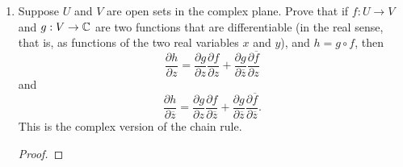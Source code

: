 \documentclass[11pt,a4paper]{book}
\begin{document}
\begin{enumerate}
    \item Suppose \( U  \) and \( V  \) are open sets in the complex plane. Prove that if \( f: U \to V  \) and \( g: V \to \mathbb{C}  \) are two functions that are differentiable (in the real sense, that is, as functions of the two real variables \( x  \) and \( y  \)), and \( h = g \circ f  \), then
       \[  \frac{ \partial h  }{  \partial z  } = \frac{ \partial g  }{  \partial z  }  \frac{  \partial f  }{  \partial z  }  + \frac{ \partial g  }{  \partial \overline{z} } \frac{ \partial \overline{f} }{ \partial z  }  \] 
       and
\[  \frac{ \partial h  }{  \partial \overline{z}  } = \frac{ \partial g  }{  \partial z  }  \frac{  \partial f  }{  \partial \overline{z}  }  + \frac{ \partial g  }{  \partial \overline{z} } \frac{ \partial \overline{f} }{ \partial \overline{z}  }.  \] 
    This is the complex version of the chain rule.
    \begin{proof}
    

\end{proof}
\end{enumerate}
\end{document}
